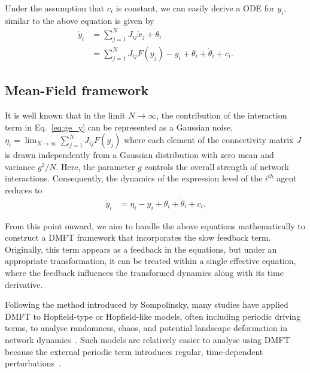 \documentclass[reprint,amsmath,amssymb,aps]{revtex4-2}
\begin{document}
Under the assumption that $c_i$ is constant, we can easily derive a ODE for $y_i$, similar to the above equation is given by
\begin{align}
\label{eq:ge_y}
    \dot{y}_i
    &= \sum_{j=1}^N J_{ij} \dot{x}_j + \dot{\theta}_i \nonumber \\
    &= \sum_{j=1}^N J_{ij} F\left(y_j\right) - y_i + \theta_i + \dot{\theta}_i + c_i.
\end{align}

\subsection{Mean-Field framework}
\label{mft}

It is well known that in the limit $N \to \infty$, the contribution of the interaction term in Eq.~\eqref{eq:ge_y} can be represented as a Gaussian noise, $\eta_i = \lim_{N\to\infty}\sum_{j=1}^N J_{ij} F(y_j)$ where each element of the connectivity matrix $J$ is drawn independently from a Gaussian distribution with zero mean and variance $g^2/N$. Here, the parameter $g$ controls the overall strength of network interactions. Consequently, the dynamics of the expression level of the $i^{th}$ agent reduces to
\begin{align*}
    \dot{y}_i
    &= \eta_i - y_i + \theta_i +\dot{\theta}_i + c_i.
\end{align*}

From this point onward, we aim to handle the above equations mathematically to construct a DMFT framework that incorporates the slow feedback term. Originally, this term appears as a feedback in the equations, but under an appropriate transformation, it can be treated within a single effective equation, where the feedback influences the transformed dynamics along with its time derivative.

Following the method introduced by Sompolinsky, many studies have applied DMFT to Hopfield-type or Hopfield-like models, often including periodic driving terms, to analyse randomness, chaos, and potential landscape deformation in network dynamics~\cite{Sompolinsky1988,crisanti1987dynamics,rajan2010stimulus,panda2017chaos,sompolinsky1982relaxational,engelken2023lyapunov}. Such models are relatively easier to analyse using DMFT because the external periodic term introduces regular, time-dependent perturbations~\cite{Sompolinsky1988,crisanti1987dynamics,rajan2010stimulus,panda2017chaos,sompolinsky1982relaxational}.
\end{document}
